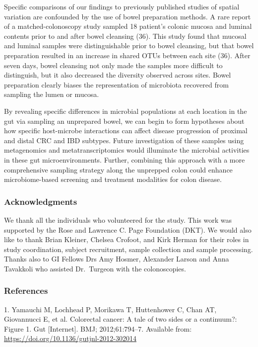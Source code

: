 \documentclass[12pt,]{article}
\begin{document}
Specific comparisons of our findings to previously published studies of
spatial variation are confounded by the use of bowel preparation
methods. A rare report of a matched-colonoscopy study sampled 18
patient's colonic mucosa and luminal contents prior to and after bowel
cleansing (36). This study found that mucosal and luminal samples were
distinguishable prior to bowel cleansing, but that bowel preparation
resulted in an increase in shared OTUs between each site (36). After
seven days, bowel cleansing not only made the samples more difficult to
distinguish, but it also decreased the diversity observed across sites.
Bowel preparation clearly biases the representation of microbiota
recovered from sampling the lumen or mucosa.

By revealing specific differences in microbial populations at each
location in the gut via sampling an unprepared bowel, we can begin to
form hypotheses about how specific host-microbe interactions can affect
disease progression of proximal and distal CRC and IBD subtypes. Future
investigation of these samples using metagenomics and
metatranscriptomics would illuminate the microbial activities in these
gut microenvironments. Further, combining this approach with a more
comprehensive sampling strategy along the unprepped colon could enhance
microbiome-based screening and treatment modalities for colon disease.

\subsubsection{Acknowledgments}\label{acknowledgments}

We thank all the individuals who volunteered for the study. This work
was supported by the Rose and Lawrence C. Page Foundation (DKT). We
would also like to thank Brian Kleiner, Chelsea Crofoot, and Kirk Herman
for their roles in study coordination, subject recruitment, sample
collection and sample processing. Thanks also to GI Fellows Drs Amy
Hosmer, Alexander Larson and Anna Tavakkoli who assisted Dr.~Turgeon
with the colonoscopies.

\newpage

\subsubsection{References}\label{references}

\hypertarget{refs}{}
\hypertarget{ref-Yamauchi2012}{}
1. Yamauchi M, Lochhead P, Morikawa T, Huttenhower C, Chan AT,
Giovannucci E, et al. Colorectal cancer: A tale of two sides or a
continuum?: Figure 1. Gut {[}Internet{]}. BMJ; 2012;61:794--7. Available
from: \url{https://doi.org/10.1136/gutjnl-2012-302014}
\end{document}
